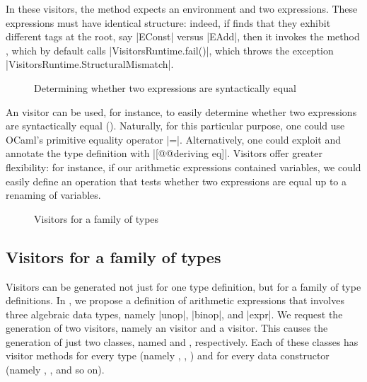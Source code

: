 \documentclass[11pt,a4paper,twoside]{article}
\begin{document}
In these visitors, the method  expects an environment and
two expressions. These expressions must have identical structure: indeed, if
 finds that they exhibit different tags at the root, say
\oc|EConst| versus \oc|EAdd|, then it invokes the method ,
which by default calls \oc|VisitorsRuntime.fail()|, which throws the exception
\oc|VisitorsRuntime.StructuralMismatch|.

\begin{figure}[t]
\caption{Determining whether two expressions are syntactically equal}
\label{fig:expr05}
\end{figure}

An \itertwo visitor can be used, for instance, to easily determine whether two
expressions are syntactically equal (). Naturally, for this
particular purpose, one could use OCaml's primitive equality operator \oc|=|.
Alternatively, one could exploit \ppxderiving and annotate the type definition with
\oc|[@@deriving eq]|. Visitors offer greater flexibility: for instance, if our
arithmetic expressions contained variables, we could easily define an
operation that tests whether two expressions are equal up to a renaming of
variables.


\begin{figure}[t]
\caption{Visitors for a family of types}
\label{fig:expr06}
\end{figure}

\subsection{Visitors for a family of types}
\label{sec:intro:family}

Visitors can be generated not just for one type definition, but for a family
of type definitions. In , we propose a definition of
arithmetic expressions that involves three algebraic data types, namely
\oc|unop|, \oc|binop|, and \oc|expr|. We request the generation of two
visitors, namely an \iter visitor and a \map visitor. This causes the
generation of just two classes, named \iter and \map, respectively. Each of
these classes has visitor methods for every type (namely ,
, ) and for every data constructor
(namely , , and so on).
\end{document}
